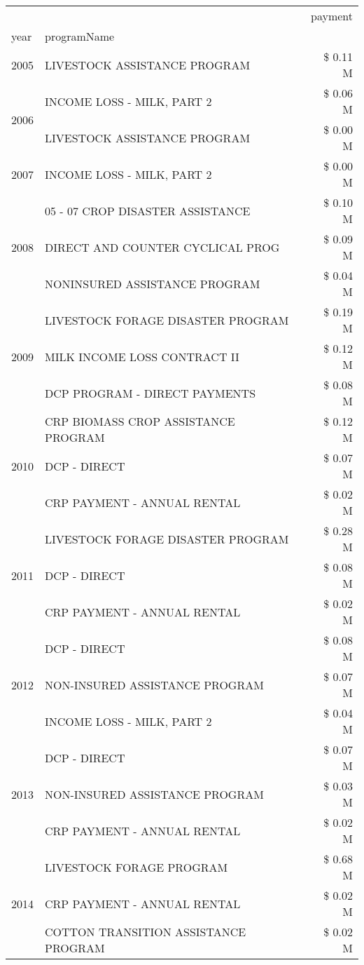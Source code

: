 \begin{tabular}{llr}
\toprule
 &  & payment \\
year & programName &  \\
\midrule
2005 & LIVESTOCK ASSISTANCE PROGRAM & \$ 0.11 M \\
\cline{1-3}
\multirow[t]{2}{*}{2006} & INCOME LOSS - MILK, PART 2 & \$ 0.06 M \\
 & LIVESTOCK ASSISTANCE PROGRAM & \$ 0.00 M \\
\cline{1-3}
2007 & INCOME LOSS - MILK, PART 2 & \$ 0.00 M \\
\cline{1-3}
\multirow[t]{3}{*}{2008} & 05 - 07 CROP DISASTER ASSISTANCE & \$ 0.10 M \\
 & DIRECT AND COUNTER CYCLICAL PROG & \$ 0.09 M \\
 & NONINSURED ASSISTANCE PROGRAM & \$ 0.04 M \\
\cline{1-3}
\multirow[t]{3}{*}{2009} & LIVESTOCK FORAGE DISASTER  PROGRAM & \$ 0.19 M \\
 & MILK INCOME LOSS CONTRACT II & \$ 0.12 M \\
 & DCP PROGRAM - DIRECT PAYMENTS & \$ 0.08 M \\
\cline{1-3}
\multirow[t]{3}{*}{2010} & CRP BIOMASS CROP ASSISTANCE PROGRAM & \$ 0.12 M \\
 & DCP - DIRECT & \$ 0.07 M \\
 & CRP PAYMENT - ANNUAL RENTAL & \$ 0.02 M \\
\cline{1-3}
\multirow[t]{3}{*}{2011} & LIVESTOCK FORAGE DISASTER PROGRAM & \$ 0.28 M \\
 & DCP - DIRECT & \$ 0.08 M \\
 & CRP PAYMENT - ANNUAL RENTAL & \$ 0.02 M \\
\cline{1-3}
\multirow[t]{3}{*}{2012} & DCP - DIRECT & \$ 0.08 M \\
 & NON-INSURED ASSISTANCE PROGRAM & \$ 0.07 M \\
 & INCOME LOSS - MILK, PART 2 & \$ 0.04 M \\
\cline{1-3}
\multirow[t]{3}{*}{2013} & DCP - DIRECT & \$ 0.07 M \\
 & NON-INSURED ASSISTANCE PROGRAM & \$ 0.03 M \\
 & CRP PAYMENT - ANNUAL RENTAL & \$ 0.02 M \\
\cline{1-3}
\multirow[t]{3}{*}{2014} & LIVESTOCK FORAGE PROGRAM & \$ 0.68 M \\
 & CRP PAYMENT - ANNUAL RENTAL & \$ 0.02 M \\
 & COTTON TRANSITION ASSISTANCE PROGRAM & \$ 0.02 M \\

\end{tabular}
